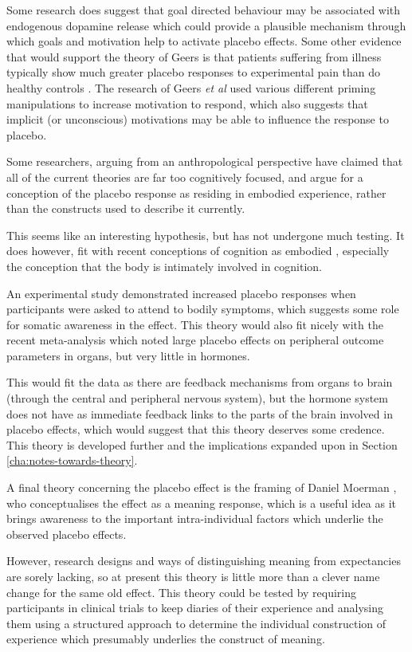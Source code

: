 Some research does suggest that goal directed behaviour may be associated with endogenous dopamine release \cite{Scott2007a} which could provide a plausible mechanism through which  goals and motivation help to activate placebo effects. Some other evidence that would support the theory of Geers is that patients suffering from illness typically show much greater placebo responses to experimental pain than do healthy controls \cite{Klinger2007a}. The research of Geers \textit{et al } used various different priming manipulations to increase motivation to respond, which also suggests that implicit (or unconscious) motivations may be able to influence the response to placebo. 

Some researchers, arguing from an anthropological perspective \cite{Thompson2009}  have claimed that all of the current theories are far too cognitively focused, and argue for a conception of the placebo response as residing in embodied experience, rather than the constructs used to describe it currently. 

This seems like an interesting hypothesis, but has not undergone much testing. It does however, fit with recent conceptions of cognition as embodied \cite{wilson2002six}, especially the conception that the body is intimately involved in cognition.  

An experimental study \cite{Geers2006} demonstrated increased placebo responses when participants were asked to attend to bodily symptoms, which suggests some role for somatic awareness in the effect. This theory would also fit nicely with the recent meta-analysis \cite{Meissner2007} which noted large placebo effects on peripheral outcome parameters in organs, but very little in hormones. 

This would fit the data as there are feedback mechanisms from organs to brain (through the central and peripheral nervous system), but the hormone system does not have as immediate feedback links to the parts of the brain involved in placebo effects, which would suggest that this theory deserves some credence. This theory is developed further and the implications expanded upon in Section \ref{cha:notes-towards-theory}.

A final theory concerning the placebo effect is the framing of Daniel Moerman \cite{Moerman2000a,Moerman2003}, who conceptualises the effect as a meaning response, which is a useful idea as it brings awareness to the important intra-individual factors which underlie the observed placebo effects. 

However, research designs and ways of distinguishing meaning from expectancies are sorely lacking, so at present this theory is little more than a clever name change for the same old effect.  This theory  could be tested by requiring participants in clinical trials to keep diaries of their experience and analysing them using a structured approach to determine the individual construction of experience which presumably underlies the construct of meaning. 


